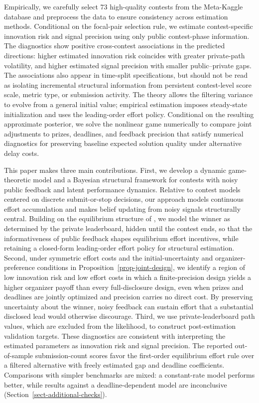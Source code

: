 \documentclass[mnsc]{informs3}
\begin{document}
Empirically, we carefully select 73 high-quality contests from the Meta-Kaggle database and preprocess the data to ensure consistency across estimation methods.
Conditional on the focal-pair selection rule, we estimate contest-specific innovation risk and signal precision using only public contest-phase information.
The diagnostics show positive cross-contest associations in the predicted directions: higher estimated innovation risk coincides with greater private-path volatility, and higher estimated signal precision with smaller public--private gaps. The associations also appear in time-split specifications, but should not be read as isolating incremental structural information from persistent contest-level score scale, metric type, or submission activity.
{The theory allows the filtering variance to evolve from a general initial value; empirical estimation imposes steady-state initialization and uses the leading-order effort policy. Conditional on the resulting approximate posterior, we solve the nonlinear game numerically to compare joint adjustments to prizes, deadlines, and feedback precision that satisfy numerical diagnostics for preserving baseline expected solution quality under alternative delay costs.}


This paper makes three main contributions.
First, we develop a dynamic game-theoretic model and a Bayesian structural framework for contests with noisy public feedback and latent performance dynamics.
Relative to contest models centered on discrete submit-or-stop decisions, our approach models continuous effort accumulation and makes belief updating from noisy signals structurally central.
Building on the equilibrium structure of \citet{Ryvkin2022Fight}, we model the winner as determined by the private leaderboard, hidden until the contest ends, so that the informativeness of public feedback shapes equilibrium effort incentives, while retaining a closed-form leading-order effort policy for structural estimation.
{Second, under symmetric effort costs and the initial-uncertainty and organizer-preference conditions in Proposition~\ref{prop-joint-design}, we identify a region of low innovation risk and low effort costs in which a finite-precision design yields a higher organizer payoff than every full-disclosure design, even when prizes and deadlines are jointly optimized and precision carries no direct cost.} By preserving uncertainty about the winner, noisy feedback can sustain effort that a substantial disclosed lead would otherwise discourage.
Third, we use private-leaderboard path values, which are excluded from the likelihood, to construct post-estimation validation targets.
These diagnostics are consistent with interpreting the estimated parameters as innovation risk and signal precision. {The reported out-of-sample submission-count scores favor the first-order equilibrium effort rule over a filtered alternative with freely estimated gap and deadline coefficients.} Comparisons with simpler benchmarks are mixed: a constant-rate model performs better, while results against a deadline-dependent model are inconclusive (Section~\ref{sect-additional-checks}).
\end{document}
